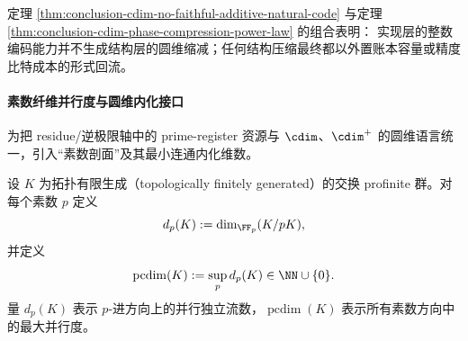 \begin{remark}[与实现层编码语义的分层]\label{rem:conclusion-cdim-implementation-vs-structure}
定理 \ref{thm:conclusion-cdim-no-faithful-additive-natural-code} 与定理 \ref{thm:conclusion-cdim-phase-compression-power-law} 的组合表明：
实现层的整数编码能力并不生成结构层的圆维缩减；任何结构压缩最终都以外置账本容量或精度比特成本的形式回流。
\end{remark}



\paragraph{素数纤维并行度与圆维内化接口}
为把 residue/逆极限轴中的 prime-register 资源与 \(\cdim\)、\(\cdim^+\) 的圆维语言统一，引入“素数剖面”及其最小连通内化维数。

\begin{definition}[素数剖面与素数圆维]\label{def:conclusion-prime-profile-pcdim}
设 \(K\) 为拓扑有限生成（topologically finitely generated）的交换 profinite 群。对每个素数 \(p\) 定义
\[
d_p(K):=\dim_{\FF_p}(K/pK),
\]
并定义
\[
\operatorname{pcdim}(K):=\sup_{p}d_p(K)\in\NN\cup\{0\}.
\]
量 \(d_p(K)\) 表示 \(p\)-进方向上的并行独立流数，\(\operatorname{pcdim}(K)\) 表示所有素数方向中的最大并行度。
\end{definition}

